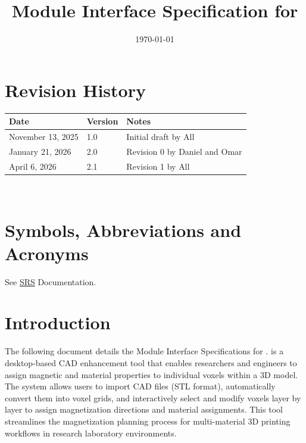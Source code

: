 \documentclass[12pt, titlepage]{article}
\begin{document}
\title{Module Interface Specification for \progname{}}

\author{\authname}

\date{\today}

\maketitle


\section{Revision History}

\begin{tabularx}{\textwidth}{p{3cm}p{2cm}X}
\toprule {\bf Date} & {\bf Version} & {\bf Notes}\\
\midrule
November 13, 2025 & 1.0 & Initial draft by All\\
January 21, 2026 & 2.0 & Revision 0 by Daniel and Omar\\
April 6, 2026 & 2.1 & Revision 1 by All\\
\bottomrule
\end{tabularx}

~\newpage

\section{Symbols, Abbreviations and Acronyms}

See \href{https://github.com/OmarHassanAdelhamid/Five-of-a-Kind-capstone-project-/blob/main/docs/SRS-Meyer/requirements/SRS.pdf}{SRS} Documentation.

\newpage

\tableofcontents

\newpage


\section{Introduction}

The following document details the Module Interface Specifications for \progname{}. \progname{} is a desktop-based CAD enhancement tool that enables researchers and engineers to assign magnetic and material properties to individual voxels within a 3D model. The system allows users to import CAD files (STL format), automatically convert them into voxel grids, and interactively select and modify voxels layer by layer to assign magnetization directions and material assignments. This tool streamlines the magnetization planning process for multi-material 3D printing workflows in research laboratory environments.
\end{document}
